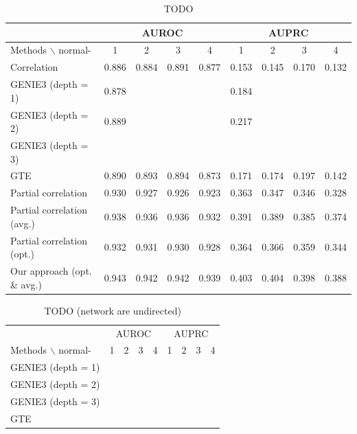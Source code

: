 \documentclass[wcp]{jmlr}
\begin{document}
\begin{table}
\small
\centering
\begin{tabular}{@{}l *{8}{c}@{}}
  & \multicolumn{4}{c}{AUROC} & \multicolumn{4}{c}{AUPRC} \\
\hline \hline
Methods $\backslash$ normal- & 1 & 2 & 3 & 4 & 1 & 2 & 3 & 4 \\
\hline \hline
Correlation            & 0.886 & 0.884 & 0.891 & 0.877 & 0.153 & 0.145 & 0.170 & 0.132 \\
GENIE3 (depth = 1)     & 0.878 & & & & 0.184 & & & \\
GENIE3 (depth = 2)     & 0.889 & & & & 0.217 & & & \\
GENIE3 (depth = 3)     & & & & & & & & \\
GTE                    & 0.890 & 0.893 & 0.894 & 0.873 & 0.171 & 0.174 & 0.197 & 0.142 \\
Partial correlation    & 0.930 &  0.927 &  0.926 &  0.923& 0.363  & 0.347 &  0.346 & 0.328 \\
Partial correlation (avg.) & 0.938 & 0.936 & 0.936 & 0.932& 0.391 & 0.389 & 0.385 & 0.374\\
Partial correlation (opt.) & 0.932 & 0.931 & 0.930 & 0.928 & 0.364 & 0.366 & 0.359 & 0.344 \\
Our approach (opt. \& avg.)    & 0.943 & 0.942 & 0.942 & 0.939 & 0.403 & 0.404 & 0.398 & 0.388 \\
\end{tabular}
\caption{TODO}
\label{tab:tab1}
\end{table}


\begin{table}
\small
\centering
\begin{tabular}{@{}l *{8}{c}@{}}
  & \multicolumn{4}{c}{AUROC} & \multicolumn{4}{c}{AUPRC} \\
\cmidrule(r){2-5}\cmidrule(r){6-9}
Methods $\backslash$ normal- & 1 & 2 & 3 & 4 & 1 & 2 & 3 & 4 \\
\hline \hline
GENIE3 (depth = 1)     &  & & & & & & & \\
GENIE3 (depth = 2)     &  & & & & & & & \\
GENIE3 (depth = 3)     &  & & & & & & & \\
GTE                    &  & & & & & & & \\
\end{tabular}
\caption{TODO (network are undirected)}
\label{tab:tab2}
\end{table}
\end{document}
